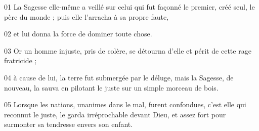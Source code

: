 01 La Sagesse elle-même a veillé sur celui qui fut façonné le premier, créé seul, le père du monde ; puis elle l’arracha à sa propre faute,

02 et lui donna la force de dominer toute chose.

03 Or un homme injuste, pris de colère, se détourna d’elle et périt de cette rage fratricide ;

04 à cause de lui, la terre fut submergée par le déluge, mais la Sagesse, de nouveau, la sauva en pilotant le juste sur un simple morceau de bois.

05 Lorsque les nations, unanimes dans le mal, furent confondues, c’est elle qui reconnut le juste, le garda irréprochable devant Dieu, et assez fort pour surmonter sa tendresse envers son enfant.